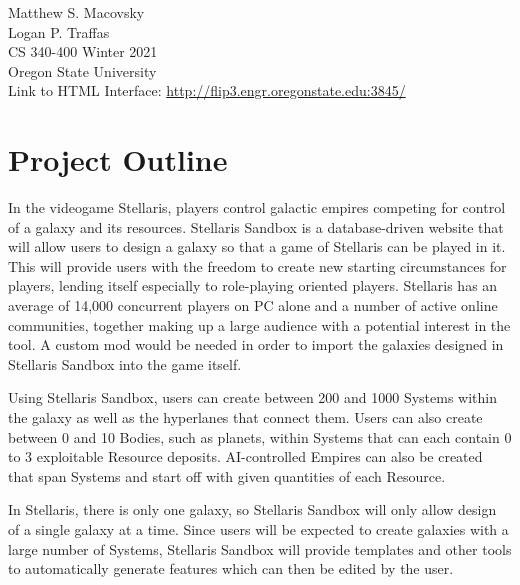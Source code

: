 \documentclass[12pt]{article}
\begin{document}
\begin{titlepage}
    \vspace*{15em}{\centering\Huge Stellaris Sandbox: \\ Implement CREATE + READ operations\par}
    \vspace{1em}
    \centering \Large Matthew S. Macovsky \\
    \vspace{0.5em}
    \centering \Large Logan P. Traffas \\
    \vspace{1em}
    \centering \Large CS 340-400 Winter 2021 \\
    \vspace{1em}
    \centering \Large Oregon State University \\
    \vspace*{\fill}
    \large Link to HTML Interface: \url{http://flip3.engr.oregonstate.edu:3845/}
\end{titlepage}

\tableofcontents

\newpage
\section{Project Outline}

In the videogame Stellaris, players control galactic empires competing for control of a galaxy and its resources. Stellaris Sandbox is a database-driven website that will allow users to design a galaxy so that a game of Stellaris can be played in it. This will provide users with the freedom to create new starting circumstances for players, lending itself especially to role-playing oriented players. Stellaris has an average of 14,000 concurrent players on PC alone and a number of active online communities, together making up a large audience with a potential interest in the tool. A custom mod would be needed in order to import the galaxies designed in Stellaris Sandbox into the game itself. 

Using Stellaris Sandbox, users can create between 200 and 1000 Systems within the galaxy as well as the hyperlanes that connect them. Users can also create between 0 and 10 Bodies, such as planets, within Systems that can each contain 0 to 3 exploitable Resource deposits. AI-controlled Empires can also be created that span Systems and start off with given quantities of each Resource.

In Stellaris, there is only one galaxy, so Stellaris Sandbox will only allow design of a single galaxy at a time. Since users will be expected to create galaxies with a large number of Systems, Stellaris Sandbox will provide templates and other tools to automatically generate features which can then be edited by the user.
\end{document}
